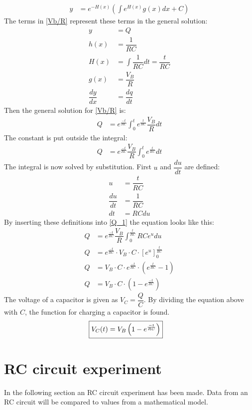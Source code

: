 \begin{align*}
y&=e^{-H(x)}\left(\int e^{H(x)}g(x)dx+C\right)
\end{align*}
The terms in \eqref{Vb/R} represent these terms in the general solution:
\begin{align*}
y &= Q
\\
h(x) &= \dfrac{1}{RC}
\\
H(x) &= \int \dfrac{1}{RC}dt=\dfrac{t}{RC}
\\
g(x) &= \dfrac{V_B}{R}
\\
\dfrac{dy}{dx} &= \dfrac{dq}{dt}
\end{align*}
Then the general solution for \eqref{Vb/R} is:
\begin{align*}
Q&= e^{\frac{-t}{RC}}\int_{0}^{t}e^{\frac{t}{RC}}\dfrac{V_B}{R}dt
\end{align*}
The constant is put outside the integral:
\begin{align}
Q&= e^{\frac{-t}{RC}}\dfrac{V_B}{R}\int_{0}^{t}e^{\frac{t}{RC}}dt \label{Q_1}
\end{align}
The integral is now solved by substitution. First $u$ and $\dfrac{du}{dt}$ are defined:
\begin{align*}
u &= \dfrac{t}{RC}
\\
\dfrac{du}{dt}&=\dfrac{1}{RC}
\\
dt &=RC du
\end{align*} 
By inserting these definitions into \eqref{Q_1} the equation looks like this:
\begin{align*}
Q &= e^{\frac{-t}{RC}}\dfrac{V_B}{R}\int_{0}^{\frac{t}{RC}}RCe^u du
\\
Q &= e^{\frac{-t}{RC}}\cdot V_B\cdot C\cdot \left[e^u\right]_{0}^{\frac{t}{RC}}
\\
Q &= V_B \cdot C\cdot e^{\frac{-t}{RC}}\cdot\left(e^{\frac{t}{RC}}-1\right)
\\
Q &= V_B \cdot C \cdot \left(1-e^{\frac{-t}{RC}}\right)
\end{align*} 
The voltage of a capacitor is given as $V_C=\dfrac{Q}{C}$. By dividing the equation above with $C$, the function for charging a capacitor is found.
\begin{align}
\label{V_up}
\Aboxed{
V_C(t)=V_B\left(1-e^{\frac{-t}{RC}}\right)
}
\end{align}
\section{RC circuit experiment}
In the following section an RC circuit experiment has been made. Data from an RC circuit will be compared to values from a mathematical model.
